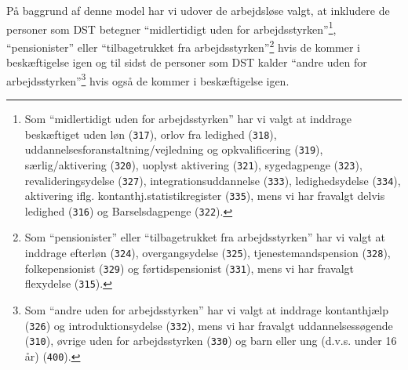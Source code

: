 %
På baggrund af denne model har vi udover de arbejdsløse valgt, at inkludere de personer som DST betegner “midlertidigt uden for arbejdsstyrken”\footnote{Som “midlertidigt uden for arbejdsstyrken” har vi valgt at inddrage beskæftiget uden løn (\texttt{317}), orlov fra ledighed (\texttt{318}), uddannelsesforanstaltning/vejledning  og  opkvalificering (\texttt{319}), særlig/aktivering (\texttt{320}), uoplyst aktivering (\texttt{321}), sygedagpenge (\texttt{323}), revalideringsydelse (\texttt{327}), integrationsuddannelse (\texttt{333}), ledighedsydelse (\texttt{334}), aktivering  iflg. kontanthj.statistikregister (\texttt{335}), mens vi har fravalgt delvis ledighed (\texttt{316}) og Barselsdagpenge (\texttt{322}).}, “pensionister” eller “tilbagetrukket fra arbejdsstyrken”\footnote{Som “pensionister” eller “tilbagetrukket fra arbejdsstyrken” har vi valgt at inddrage efterløn (\texttt{324}), overgangsydelse (\texttt{325}), tjenestemandspension (\texttt{328}), folkepensionist (\texttt{329}) og førtidspensionist (\texttt{331}), mens vi har fravalgt flexydelse (\texttt{315}).} hvis de kommer i beskæftigelse igen og til sidst de personer som DST kalder “andre uden for arbejdsstyrken”\footnote{Som “andre uden for arbejdsstyrken” har vi valgt at inddrage kontanthjælp (\texttt{326}) og introduktionsydelse (\texttt{332}), mens vi har fravalgt uddannelsessøgende (\texttt{310}), øvrige  uden for arbejdsstyrken (\texttt{330}) og barn eller ung (d.v.s. under 16  år) (\texttt{400}).} hvis også de kommer i beskæftigelse igen.

